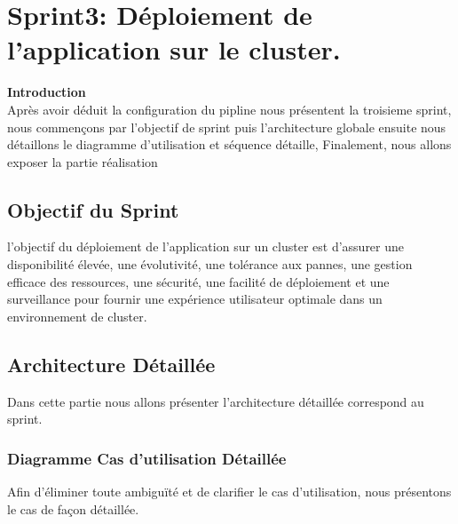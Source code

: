 \chapter{Sprint3: Déploiement de l'application sur le cluster.}
\newpage
\textbf{\huge Introduction} \\[1cm]

\textsf{\selectfont{}
Après avoir déduit la configuration du pipline nous présentent la troisieme  sprint, nous commençons par l'objectif de sprint puis l'architecture globale ensuite nous détaillons le diagramme d'utilisation et séquence détaille, Finalement, nous allons exposer la partie réalisation}


\section{\LARGE Objectif du Sprint}
\textsf{\selectfont{} l'objectif du déploiement de l'application sur un cluster est d'assurer une disponibilité élevée, une évolutivité, une tolérance aux pannes, une gestion efficace des ressources, une sécurité, une facilité de déploiement et une surveillance pour fournir une expérience utilisateur optimale dans un environnement de cluster.}


\section{\LARGE Architecture Détaillée}
\textsf{\selectfont{}Dans cette partie nous allons présenter l'architecture détaillée correspond au sprint.}

\subsection{\Large Diagramme Cas d'utilisation Détaillée}
\textsf{\selectfont{}Afin d'éliminer toute ambiguïté et de clarifier le cas d'utilisation, nous présentons le cas de façon détaillée.}

